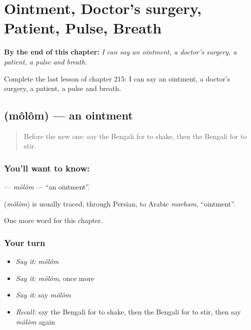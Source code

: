
\chapter{Ointment, Doctor's surgery, Patient, Pulse, Breath}
\label{ch:bn-ointment-doctor-s-surgery-patient-pulse-breath}

\begin{chapteropening}
\textbf{By the end of this chapter:} \emph{I can say an ointment, a doctor's surgery, a patient, a pulse and breath.}

Complete the last lesson of chapter 215: I can say an ointment, a doctor's surgery, a patient, a pulse and breath.
\end{chapteropening}

\section[\texorpdfstring{\bn{মলম} (môlôm)}{মলম (môlôm)}]{ (môlôm) — an ointment}

\label{lesson:BN-C215-molom}



\begin{quote}
Before the new one: say the Bengali for to shake, then the Bengali for to stir.
\end{quote}

\subsection*{You'll want to know: }
\textbf{} — \emph{môlôm} — \textquotedblleft{}an ointment\textquotedblright{}.

\begin{cousinweb}
\textbf{} (\emph{môlôm}) is usually traced, through Persian, to Arabic \emph{marham}, \textquotedblleft{}ointment\textquotedblright{}.
\end{cousinweb}

\begin{grammarlens}[title={What you've built}]
One more word for this chapter.
\end{grammarlens}

\subsection*{Your turn}
\begin{itemize}
\raggedright
  \item \emph{Say it:} \emph{môlôm}
  \item \emph{Say it:} \emph{môlôm}, once more
  \item \emph{Say it:} say \emph{môlôm}
  \item \emph{Recall:} say the Bengali for to shake, then the Bengali for to stir, then say \emph{môlôm} again
\end{itemize}


